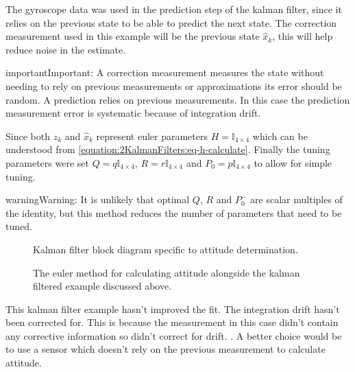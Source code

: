 \documentclass[letterpaper,10pt,english]{jupyterBook}
\begin{document}
\sphinxAtStartPar
The gyroscope data was used in the prediction step of the kalman filter, since it relies on the previous state to be able to predict the next state. The correction measurement used in this example will be the previous state \(\hat{x}_k\), this will help reduce noise in the estimate.

\begin{sphinxadmonition}{important}{Important:}
\sphinxAtStartPar
A correction measurement measures the state without needing to rely on previous measurements or approximations its error should be random. A prediction relies on previous measurements. In this case the prediction measurement error is systematic because of integration drift.
\end{sphinxadmonition}

\sphinxAtStartPar
Since both \(z_k\) and \(\hat{x}_k\) represent euler parameters \(H = \mathbb{I}_{4 \times 4}\) which can be understood from \eqref{equation:2KalmanFilters:eq-h-calculate}. Finally the tuning parameters were set \(Q = q\mathbb{I}_{4 \times 4}\), \(R = r\mathbb{I}_{4 \times 4}\) and \(P_0 = p\mathbb{I}_{4 \times 4}\) to allow for simple tuning.

\begin{sphinxadmonition}{warning}{Warning:}
\sphinxAtStartPar
It is unlikely that optimal \(Q\), \(R\) and \(P^-_0\) are scalar multiples of the identity, but this method reduces the number of parameters that need to be tuned.
\end{sphinxadmonition}

\begin{figure}[htbp]
\centering
\capstart

\noindent{}
\caption{Kalman filter block diagram specific to attitude determination.}\label{\detokenize{5IMU:id2}}\end{figure}

\begin{figure}[htbp]
\centering
\capstart

\noindent{}
\caption{The euler method for calculating attitude alongside the kalman filtered example discussed above. }\label{\detokenize{5IMU:id3}}\end{figure}

\sphinxAtStartPar
This kalman filter example hasn’t improved the fit. The integration drift hasn’t been corrected for. This is because the measurement in this case didn’t contain any corrective information so didn’t correct for drift. . A better choice would be to use a sensor which doesn’t rely on the previous measurement to calculate attitude.
\end{document}
